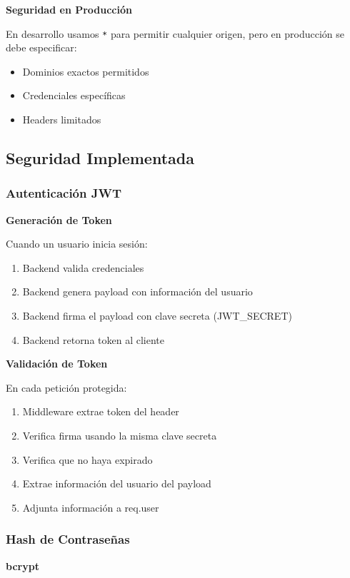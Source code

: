 \documentclass[12pt,a4paper]{article}
\begin{document}
\textbf{Seguridad en Producción}

En desarrollo usamos \texttt{*} para permitir cualquier origen, pero en producción se debe especificar:
\begin{itemize}
    \item Dominios exactos permitidos
    \item Credenciales específicas
    \item Headers limitados
\end{itemize}

\subsection{Seguridad Implementada}

\subsubsection{Autenticación JWT}

\textbf{Generación de Token}

Cuando un usuario inicia sesión:
\begin{enumerate}
    \item Backend valida credenciales
    \item Backend genera payload con información del usuario
    \item Backend firma el payload con clave secreta (JWT\_SECRET)
    \item Backend retorna token al cliente
\end{enumerate}

\textbf{Validación de Token}

En cada petición protegida:
\begin{enumerate}
    \item Middleware extrae token del header
    \item Verifica firma usando la misma clave secreta
    \item Verifica que no haya expirado
    \item Extrae información del usuario del payload
    \item Adjunta información a req.user
\end{enumerate}

\subsubsection{Hash de Contraseñas}

\textbf{bcrypt}
\end{document}
